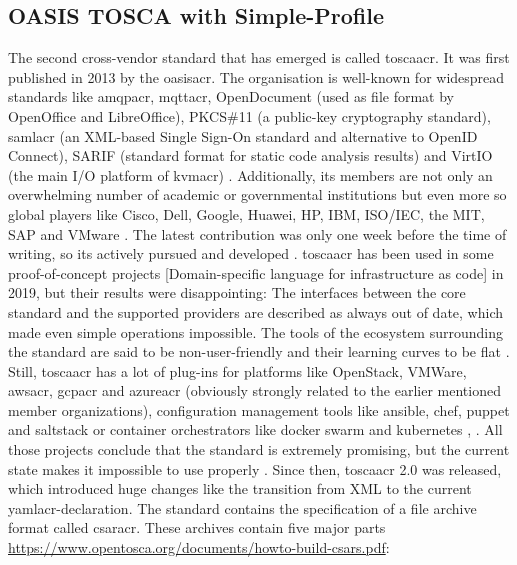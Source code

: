 \subsection{OASIS TOSCA with Simple-Profile}
The second cross-vendor standard that has emerged is called \gls{toscaacr}. It was first published in 2013 by the \gls{oasisacr}. The organisation is well-known for widespread standards like \gls{amqpacr}, \gls{mqttacr}, OpenDocument (used as file format by OpenOffice and LibreOffice), PKCS\#11 (a public-key cryptography standard), \gls{samlacr} (an XML-based Single Sign-On standard and alternative to OpenID Connect), SARIF (standard format for static code analysis results) and VirtIO (the main I/O platform of \gls{kvmacr}) \cite{oasis_standards}. Additionally, its members are not only an overwhelming number of academic or governmental institutions but even more so global players like Cisco, Dell, Google, Huawei, HP, IBM, ISO/IEC, the MIT, SAP and VMware \cite{oasis_tosca_members} \cite{oasis_tosca_obligations} \cite{oasis_members}. The latest contribution was only one week before the time of writing, so its actively pursued and developed \cite{tosca_standard_v2} \cite{tosca_releases}.
\newline
\gls{toscaacr} has been used in some proof-of-concept projects [Domain-specific language for infrastructure as code] in 2019, but their results were disappointing: The interfaces between the core standard and the supported providers are described as always out of date, which made even simple operations impossible. The tools of the ecosystem surrounding the standard are said to be non-user-friendly and their learning curves to be flat \cite{adminmagazin_aria_tosca}.
Still, \gls{toscaacr} has a lot of plug-ins for platforms like OpenStack, VMWare, \gls{awsacr}, \gls{gcpacr} and \gls{azureacr} (obviously strongly related to the earlier mentioned member organizations), configuration management tools like ansible, chef, puppet and saltstack or container orchestrators like docker swarm and kubernetes \cite{adminmagazin_aria_tosca}, \cite{vmware_tosca_components}.
All those projects conclude that the standard is extremely promising, but the current state makes it impossible to use properly \cite{adminmagazin_aria_tosca}.
\newline
Since then, \gls{toscaacr} 2.0 was released, which introduced huge changes like the transition from XML to the current \gls{yamlacr}-declaration.
\newline
The standard contains the specification of a file archive format called \gls{csaracr}. These archives contain five major parts \url{https://www.opentosca.org/documents/howto-build-csars.pdf}:
